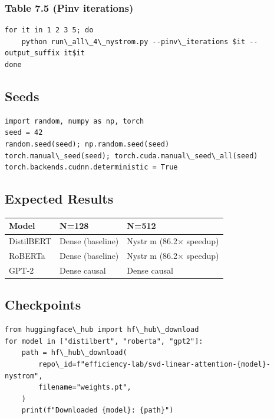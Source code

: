 \subsubsection{Table 7.5 (Pinv iterations)}

\begin{lstlisting}
for it in 1 2 3 5; do
    python run\_all\_4\_nystrom.py --pinv\_iterations $it --output_suffix it$it
done
\end{lstlisting}

\subsection{Seeds}

\begin{lstlisting}
import random, numpy as np, torch
seed = 42
random.seed(seed); np.random.seed(seed)
torch.manual\_seed(seed); torch.cuda.manual\_seed\_all(seed)
torch.backends.cudnn.deterministic = True
\end{lstlisting}

\subsection{Expected Results}

\begin{table}[H]
\centering
\small
\begin{tabular}{lll}
\toprule
\textbf{Model} & \textbf{N=128} & \textbf{N=512} \\
\midrule
DistilBERT & Dense (baseline) & Nystr m (86.2$\times$ speedup) \\
RoBERTa & Dense (baseline) & Nystr m (86.2$\times$ speedup) \\
GPT-2 & Dense causal & Dense causal \\
\bottomrule
\end{tabular}
\end{table}

\subsection{Checkpoints}

\begin{lstlisting}
from huggingface\_hub import hf\_hub\_download
for model in ["distilbert", "roberta", "gpt2"]:
    path = hf\_hub\_download(
        repo\_id=f"efficiency-lab/svd-linear-attention-{model}-nystrom",
        filename="weights.pt",
    )
    print(f"Downloaded {model}: {path}")
\end{lstlisting}

